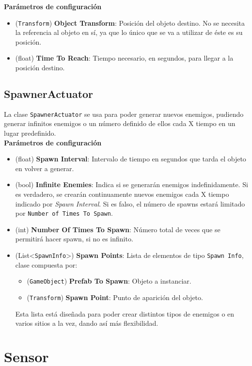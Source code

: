 \textbf{Parámetros de configuración}
\begin{itemize} 
	\item (\texttt{Transform}) \textbf{Object Transform}: Posición del objeto destino. No se necesita la referencia al objeto en sí, ya que lo único que se va a utilizar de éste es su posición.
	\item (float) \textbf{Time To Reach}: Tiempo necesario, en segundos, para llegar a la posición destino.
\end{itemize}

\subsection{SpawnerActuator}
La clase \texttt{SpawnerActuator} se usa para poder generar nuevos enemigos, pudiendo generar infinitos enemigos o un número definido de ellos cada X tiempo en un lugar predefinido.\\

\textbf{Parámetros de configuración}
\begin{itemize}
    \item (float) \textbf{Spawn Interval}: Intervalo de tiempo en segundos que tarda el objeto en volver a generar. 
    \item (bool) \textbf{Infinite Enemies}: Indica si se generarán enemigos indefinidamente. Si es verdadero, se crearán continuamente nuevos enemigos cada X tiempo indicado por \textit{Spawn Interval}. Si es falso, el número de spawns estará limitado por \texttt{Number of Times To Spawn}.
    \item (int) \textbf{Number Of Times To Spawn}: Número total de veces que se permitirá hacer spawn, si no es infinito.
    \item (List<\texttt{SpawnInfo}>) \textbf{Spawn Points}: Lista de elementos de tipo \texttt{Spawn Info}, clase compuesta por:
    \begin{itemize} 
	\item (\texttt{GameObject}) \textbf{Prefab To Spawn}: Objeto a instanciar.
	\item (\texttt{Transform}) \textbf{Spawn Point}: Punto de aparición del objeto.
    \end{itemize}
    Esta lista está diseñada para poder crear distintos tipos de enemigos o en varios sitios a la vez, dando así más flexibilidad.
\end{itemize}


\section{Sensor}

